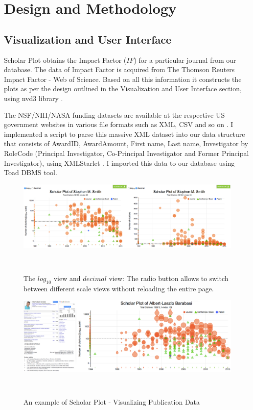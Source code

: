 \chapter{Design and Methodology}\label{chap:Methods }
\section{Visualization and User Interface}
Scholar Plot obtains the Impact Factor ($IF$) for a particular journal from our database. The data of Impact Factor is acquired from The Thomson Reuters Impact Factor - Web of Science. Based on all this information it constructs the plots as per the design outlined in the Visualization and User Interface section, using nvd3 library \cite{nvd3org}.


The NSF/NIH/NASA funding datasets are available at the respective US government websites in various file formats such as XML, CSV and so on \cite{nsf, nih}. I implemented a script to parse this massive XML dataset into our data structure that consists of AwardID, AwardAmount, First name, Last name, Investigator by RoleCode (Principal Investigator, Co-Principal Investigator and Former Principal Investigator), using XMLStarlet \cite{XMLStarlet}. I imported this data to our database using Toad DBMS tool. %

\begin{figure}%
\centering
  \includegraphics[width=1\columnwidth]{figures/fig_scaleView}
  \caption{The $log_{10}$ view and $decimal$ view: The radio button allows to switch between different scale views without reloading the entire page.}~\label{fig:fig-scale}
\end{figure}

\begin{figure}
  \centering
  \includegraphics[width=1\columnwidth]{figures/fig_cv_google_scholarplot}
  \caption{An example of Scholar Plot - Visualizing Publication Data}~\label{fig:fig-publication}
\end{figure}

